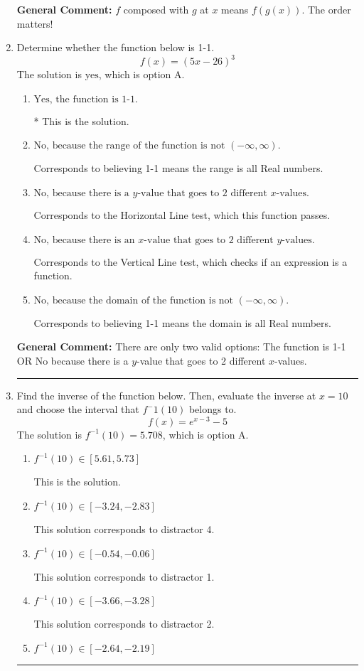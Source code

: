\documentclass{extbook}[14pt]
\newcommand{\litem}[1]{\item #1

\rule{\textwidth}{0.4pt}}
\begin{document}
\begin{enumerate}
{\textbf{General Comment:} $f$ composed with $g$ at $x$ means $f(g(x))$. The order matters!
}
\litem{
Determine whether the function below is 1-1.
\[ f(x) = (5 x - 26)^3 \]The solution is \( \text{yes} \), which is option A.\begin{enumerate}[label=\Alph*.]
\item \( \text{Yes, the function is 1-1.} \)

* This is the solution.
\item \( \text{No, because the range of the function is not $(-\infty, \infty)$.} \)

Corresponds to believing 1-1 means the range is all Real numbers.
\item \( \text{No, because there is a $y$-value that goes to 2 different $x$-values.} \)

Corresponds to the Horizontal Line test, which this function passes.
\item \( \text{No, because there is an $x$-value that goes to 2 different $y$-values.} \)

Corresponds to the Vertical Line test, which checks if an expression is a function.
\item \( \text{No, because the domain of the function is not $(-\infty, \infty)$.} \)

Corresponds to believing 1-1 means the domain is all Real numbers.
\end{enumerate}

\textbf{General Comment:} There are only two valid options: The function is 1-1 OR No because there is a $y$-value that goes to 2 different $x$-values.
}
\litem{
Find the inverse of the function below. Then, evaluate the inverse at $x = 10$ and choose the interval that $f^-1(10)$ belongs to.
\[ f(x) = e^{x-3}-5 \]The solution is \( f^{-1}(10) = 5.708 \), which is option A.\begin{enumerate}[label=\Alph*.]
\item \( f^{-1}(10) \in [5.61, 5.73] \)

 This is the solution.
\item \( f^{-1}(10) \in [-3.24, -2.83] \)

 This solution corresponds to distractor 4.
\item \( f^{-1}(10) \in [-0.54, -0.06] \)

 This solution corresponds to distractor 1.
\item \( f^{-1}(10) \in [-3.66, -3.28] \)

 This solution corresponds to distractor 2.
\item \( f^{-1}(10) \in [-2.64, -2.19] \)


\end{enumerate}}
\end{enumerate}
\end{document}
